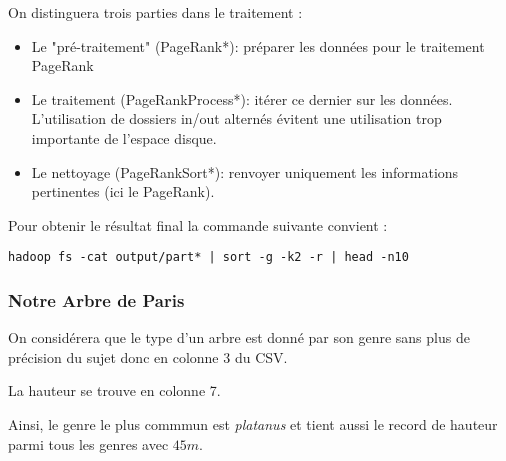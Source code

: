 \documentclass[french]{article}
\begin{document}
On distinguera trois parties dans le traitement :

\begin{itemize}
	\item Le "pré-traitement" (PageRank*): préparer les données pour le traitement PageRank
	\item Le traitement (PageRankProcess*): itérer ce dernier sur les données. L'utilisation de dossiers in/out alternés évitent une utilisation trop importante de l'espace disque.
	\item Le nettoyage (PageRankSort*): renvoyer uniquement les informations pertinentes (ici le PageRank).
\end{itemize}

Pour obtenir le résultat final la commande suivante convient : 

\begin{verbatim}
hadoop fs -cat output/part* | sort -g -k2 -r | head -n10
\end{verbatim}

\subsubsection{Notre Arbre de Paris}
On considérera que le type d'un arbre est donné par son genre sans plus de précision du sujet donc en colonne 3 du CSV.

La hauteur se trouve en colonne 7.

Ainsi, le genre le plus commmun est \textsl{platanus} et tient aussi le record de hauteur parmi tous les genres avec $45m$.
\end{document}
